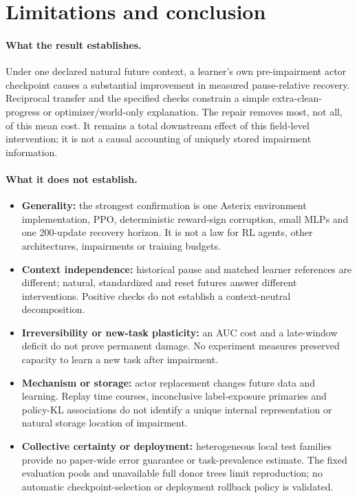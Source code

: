 \documentclass[10pt]{article}
\begin{document}
\section{Limitations and conclusion}\label{m:conclusion}
\paragraph{What the result establishes.}
Under one declared natural future context, a learner's own pre-impairment actor checkpoint causes a substantial improvement in measured pause-relative recovery. Reciprocal transfer and the specified checks constrain a simple extra-clean-progress or optimizer/world-only explanation. The repair removes most, not all, of this mean cost. It remains a total downstream effect of this field-level intervention; it is not a causal accounting of uniquely stored impairment information.

\paragraph{What it does not establish.}
\begin{itemize}[leftmargin=*,nosep]
\item \textbf{Generality:} the strongest confirmation is one Asterix environment implementation, PPO, deterministic reward-sign corruption, small MLPs and one 200-update recovery horizon. It is not a law for RL agents, other architectures, impairments or training budgets.
\item \textbf{Context independence:} historical pause and matched learner references are different; natural, standardized and reset futures answer different interventions. Positive checks do not establish a context-neutral decomposition.
\item \textbf{Irreversibility or new-task plasticity:} an AUC cost and a late-window deficit do not prove permanent damage. No experiment measures preserved capacity to learn a new task after impairment.
\item \textbf{Mechanism or storage:} actor replacement changes future data and learning. Replay time courses, inconclusive label-exposure primaries and policy-KL associations do not identify a unique internal representation or natural storage location of impairment.
\item \textbf{Collective certainty or deployment:} heterogeneous local test families provide no paper-wide error guarantee or task-prevalence estimate. The fixed evaluation pools and unavailable full donor trees limit reproduction; no automatic checkpoint-selection or deployment rollback policy is validated.
\end{itemize}
\end{document}
